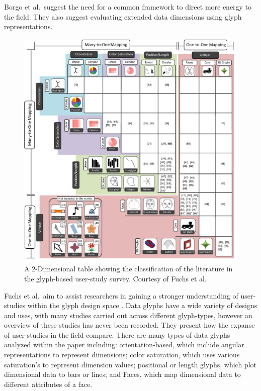 Borgo et al.\ suggest the need for a common framework to direct more energy to the field. They also suggest evaluating extended data dimensions using glyph representations.

\begin{figure}[p]
\begin{center}
\includegraphics[width=1\textwidth]{images/fuchs2016systematic.png}
\caption{A 2-Dimensional table showing the classification of the literature in the glyph-based user-study survey. Courtesy of Fuchs et al.\ \cite{fuchs2016systematic}} \label{fig:fuchs2016systematic}
\end{center}
\end{figure}
Fuchs et al.\ aim to assist researchers in gaining a stronger understanding of user-studies within the glyph design space \cite{fuchs2016systematic}. Data glyphs have a wide variety of designs and uses, with many studies carried out across different glyph-types, however an overview of these studies has never been recorded. They present how the expanse of user-studies in the field compare. There are many types of data glyphs analyzed within the paper including: orientation-based, which include angular representations to represent dimensions; color saturation, which uses various saturation's to represent dimension values; positional or length glyphs, which plot dimensional data to bars or lines; and Faces, which map dimensional data to different attributes of a face. 
